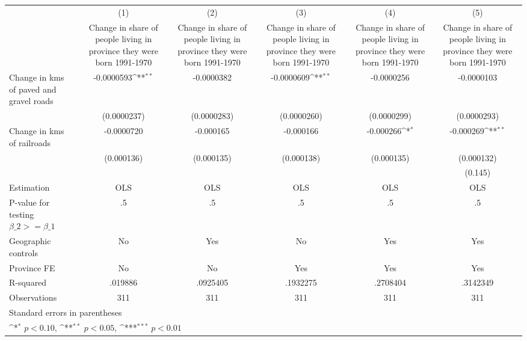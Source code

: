 {
\def\sym#1{\ifmmode^{#1}\else\(^{#1}\)\fi}
\begin{tabular}{l*{5}{c}}
\hline\hline
                    &\multicolumn{1}{c}{(1)}&\multicolumn{1}{c}{(2)}&\multicolumn{1}{c}{(3)}&\multicolumn{1}{c}{(4)}&\multicolumn{1}{c}{(5)}\\
                    &\multicolumn{1}{c}{Change in share of people living in province they were born 1991-1970}&\multicolumn{1}{c}{Change in share of people living in province they were born 1991-1970}&\multicolumn{1}{c}{Change in share of people living in province they were born 1991-1970}&\multicolumn{1}{c}{Change in share of people living in province they were born 1991-1970}&\multicolumn{1}{c}{Change in share of people living in province they were born 1991-1970}\\
\hline
Change in kms of paved and gravel roads&  -0.0000593\sym{**} &  -0.0000382         &  -0.0000609\sym{**} &  -0.0000256         &  -0.0000103         \\
                    & (0.0000237)         & (0.0000283)         & (0.0000260)         & (0.0000299)         & (0.0000293)         \\
[1em]
Change in kms of railroads&  -0.0000720         &   -0.000165         &   -0.000166         &   -0.000266\sym{*}  &   -0.000269\sym{**} \\
                    &  (0.000136)         &  (0.000135)         &  (0.000138)         &  (0.000135)         &  (0.000132)         \\
[1em]
                    &                     &                     &                     &                     &     (0.145)         \\
\hline
Estimation          &         OLS         &         OLS         &         OLS         &         OLS         &         OLS         \\
P-value for testing $\beta\_2 >= \beta\_1$&          .5         &          .5         &          .5         &          .5         &          .5         \\
Geographic controls &          No         &         Yes         &          No         &         Yes         &         Yes         \\
Province FE         &          No         &          No         &         Yes         &         Yes         &         Yes         \\
R-squared           &     .019886         &    .0925405         &    .1932275         &    .2708404         &    .3142349         \\
Observations        &         311         &         311         &         311         &         311         &         311         \\
\hline\hline
\multicolumn{6}{l}{\footnotesize Standard errors in parentheses}\\
\multicolumn{6}{l}{\footnotesize \sym{*} \(p<0.10\), \sym{**} \(p<0.05\), \sym{***} \(p<0.01\)}\\
\end{tabular}
}
